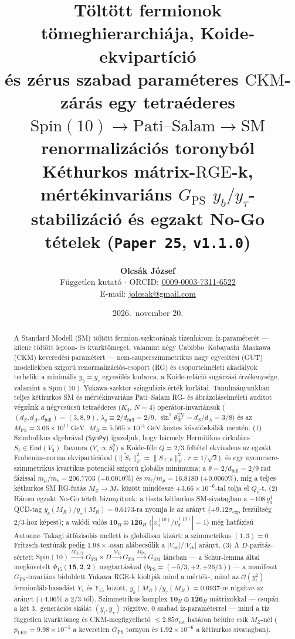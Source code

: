 \documentclass[11pt,a4paper]{article}
\title{\textbf{Töltött fermionok tömeghierarchiája, Koide-ekvipartíció\\
és zérus szabad paraméteres \texorpdfstring{$\mathrm{CKM}$}{CKM}-zárás egy tetraéderes\\
\texorpdfstring{$\mathrm{Spin}(10) \to \mathrm{Pati\text{--}Salam} \to \mathrm{SM}$}{Spin(10) -> Pati-Salam -> SM} renormalizációs toronyból}\\[0.35em]
\large Kéthurkos mátrix-\texorpdfstring{$\mathrm{RGE}$}{RGE}-k, mértékinvariáns \texorpdfstring{$G_{\mathrm{PS}}$}{GPS} \texorpdfstring{$y_b/y_\tau$}{yb/ytau}-stabilizáció és egzakt No-Go tételek (\texttt{Paper 25}, \texttt{v1.1.0})}
\author{\textbf{Olcsák József}\\
\small Független kutató $\cdot$ ORCID: \href{https://orcid.org/0009-0003-7311-6522}{0009-0003-7311-6522}\\
\small E-mail: \href{mailto:jolcsak@gmail.com}{jolcsak@gmail.com}}
\date{2026.\ november 20.}
\begin{document}
\maketitle

\begin{abstract}
\noindent A Standard Modell (SM) töltött fermion-szektorának tizenhárom íz-paraméterét --- kilenc töltött lepton- és kvarktömeget, valamint négy Cabibbo--Kobayashi--Maskawa (CKM) keveredési paramétert --- nem-szuperszimmetrikus nagy egyesítési (GUT) modellekben szigorú renormalizációs-csoport (RG) és csoportelméleti akadályok terhelik: a minimális $y_b = y_\tau$ egyesülés kudarca, a Koide-reláció sugárzási érzékenysége, valamint a $\mathrm{Spin}(10)$ Yukawa-szektor szinguláris-érték korlátai. Tanulmányunkban teljes kéthurkos SM és mértékinvariáns Pati--Salam RG- és ábrázoláselméleti auditot végzünk a négycsúcsú tetraéderes ($K_4$, $N = 4$) operátor-invariánsok ($(d_S, d_A, d_{\mathrm{full}}) = (3, 8, 9)$, $\lambda_q \equiv 2/d_{\mathrm{full}} = 2/9$, $\sin^2\theta_W^{\mathrm{UV}} = d_S/d_A = 3/8$) és az $M_{\mathrm{PS}} = 3.66\times 10^{11}\;\mathrm{GeV}$, $M_R = 5.565\times 10^{14}\;\mathrm{GeV}$ köztes küszöbskálák mentén. (1) Szimbolikus algebrával (\texttt{SymPy}) igazoljuk, hogy bármely Hermitikus cirkuláns $S_\ell \in \mathrm{End}(V_3)$ flavonra ($Y_e \propto S_\ell^2$) a Koide-féle $Q = 2/3$ feltétel ekvivalens az egzakt Frobenius-norma ekvipartícióval ($\|\tilde{S}_\ell\|_F^2 = \|S_{\ell,0}\|_F^2$, $r = 1/\sqrt{2}$), és egy nyomcsere-szimmetrikus kvartikus potenciál szigorú globális minimuma; a $\theta = 2/d_{\mathrm{full}} = 2/9\;\mathrm{rad}$ fázissal $m_\mu/m_e = 206.7703$ ($+0.0010\%$) és $m_\tau/m_\mu = 16.8180$ ($+0.0060\%$), míg a teljes kéthurkos SM RG-futás $M_Z \to M_*$ között mindössze $+3.66\times 10^{-6}$-tal tolja el $Q_e$-t. (2) Három egzakt No-Go tételt bizonyítunk: a tiszta kéthurkos SM-sivatagban a $-108\,g_3^4$ QCD-tag $y_b(M_R)/y_\tau(M_R) = 0.6173$-ra nyomja le az arányt ($+9.12\sigma_{\mathrm{exp}}$ feszültség $2/3$-hoz képest); a valódi valós $\mathbf{10}_H \oplus \overline{\mathbf{126}}_H$ ($|v_u^{(10)}/v_d^{(10)}| = 1$) még hatfázisú Autonne--Takagi átfázisolás mellett is globálisan kizárt; a szimmetrikus $(1,3)=0$ Fritzsch-textúrák pedig $1.98\times$-osan alábecsülik a $|V_{ub}|/|V_{cb}|$ arányt. (3) A $D$-paritás-sértett $\mathrm{Spin}(10) \xrightarrow{M_{\mathrm{GUT}}} G_{\mathrm{PS}}\times D \xrightarrow{M_R} G_{\mathrm{PS}} \xrightarrow{M_{\mathrm{PS}}} G_{\mathrm{SM}}$ láncban --- a Schur-lemma által megkövetelt $\Phi_{15}(\mathbf{15},\mathbf{2},\mathbf{2})$ megtartásával ($b_{\mathrm{PS}} = (-5/3, +2, +26/3)$) --- a manifeszt $G_{\mathrm{PS}}$-invariáns bidublett Yukawa RGE-k kioltják mind a mérték-, mind az $\mathcal{O}(y_t^2)$ fermionláb-hasadást $Y_1$ és $Y_{15}$ között, $y_b(M_R)/y_\tau(M_R) = 0.6937$-re rögzítve az arányt ($+4.06\%$ a $2/3$-tól). Szimmetrikus komplex $\mathbf{10}_H \oplus \overline{\mathbf{126}}_H$ mátrixokkal --- csupán a két 3.\ generációs skálát $(y_t, y_\tau)$ rögzítve, $0$ szabad íz-paraméterrel --- mind a tíz független kvarktömeg és CKM-megfigyelhető $\le 2.85\sigma_{\mathrm{tot}}$ határon belülre esik $M_Z$-nél ($p_{\mathrm{LEE}} = 9.98\times 10^{-5}$ a keveretlen $G_{\mathrm{PS}}$ tornyon és $1.92\times 10^{-6}$ a kéthurkos sivatagban).

\end{abstract}
\end{document}
